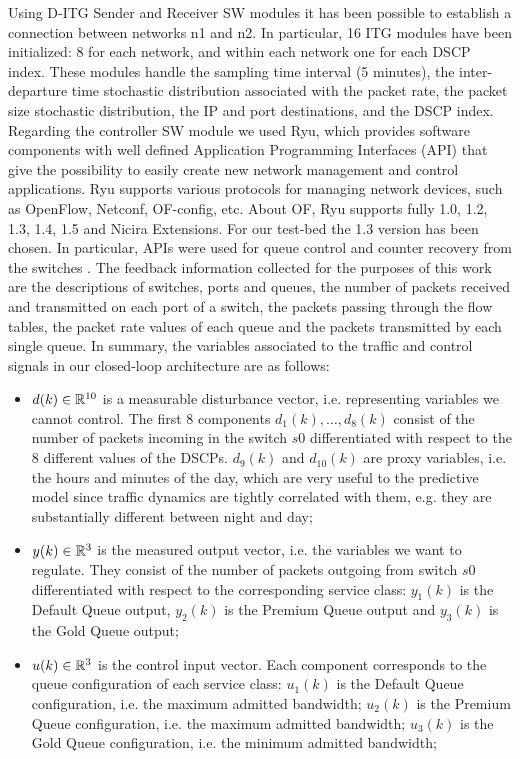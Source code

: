 Using D-ITG Sender and Receiver SW modules it has been possible to establish a connection between networks n1 and n2. In particular, 16 ITG modules have been initialized: 8 for each network, and within each network one for each DSCP index. These modules handle the sampling time interval (5 minutes), the inter-departure time stochastic distribution associated with the packet rate, the packet size stochastic distribution, the IP and port destinations, and the DSCP index. Regarding the controller SW module we used Ryu, which provides software components with well defined Application Programming Interfaces (API) that give the possibility to easily create new network management and control applications. Ryu supports various protocols for managing network devices, such as OpenFlow, Netconf, OF-config, etc. About OF, Ryu supports fully 1.0, 1.2, 1.3, 1.4, 1.5 and Nicira Extensions. For our test-bed the 1.3 version has been chosen. In particular, APIs were used for queue control and counter recovery from the switches \cite{ofctlrest,QoS}. The feedback information collected for the purposes of this work are the descriptions of switches, ports and queues, the number of packets received and transmitted on each port of a switch, the packets passing through the flow tables, the packet rate values of each queue and the packets transmitted by each single queue. In summary, the variables associated to the traffic and control signals in our closed-loop architecture are as follows:

\begin{itemize}
	\item $d(k)\in\mathbb{R}^{10}$ is a measurable disturbance vector, i.e. representing variables we cannot control. The first 8 components $d_1(k),\ldots,d_8(k)$ consist of the number of packets incoming in the switch $s0$ differentiated with respect to the 8 different values of the DSCPs. $d_9(k)$ and $d_{10}(k)$ are proxy variables, i.e. the hours and minutes of the day, which are very useful to the predictive model since traffic dynamics are tightly correlated with them, e.g. they are substantially different between night and day;
	\item $y(k)\in\mathbb{R}^{3}$ is the measured output vector, i.e. the variables we want to regulate. They consist of the number of packets outgoing from switch $s0$ differentiated with respect to the corresponding service class: $y_1(k)$ is the Default Queue output, $y_2(k)$ is the Premium Queue output and $y_3(k)$ is the Gold Queue output;
	\item $u(k)\in\mathbb{R}^{3}$ is the control input vector. Each component corresponds to the queue configuration of each service class: $u_1(k)$ is the Default Queue configuration, i.e. the maximum admitted bandwidth; $u_2(k)$ is the Premium Queue configuration, i.e. the maximum admitted bandwidth; $u_3(k)$ is the Gold Queue configuration, i.e. the minimum admitted bandwidth;
\end{itemize}

